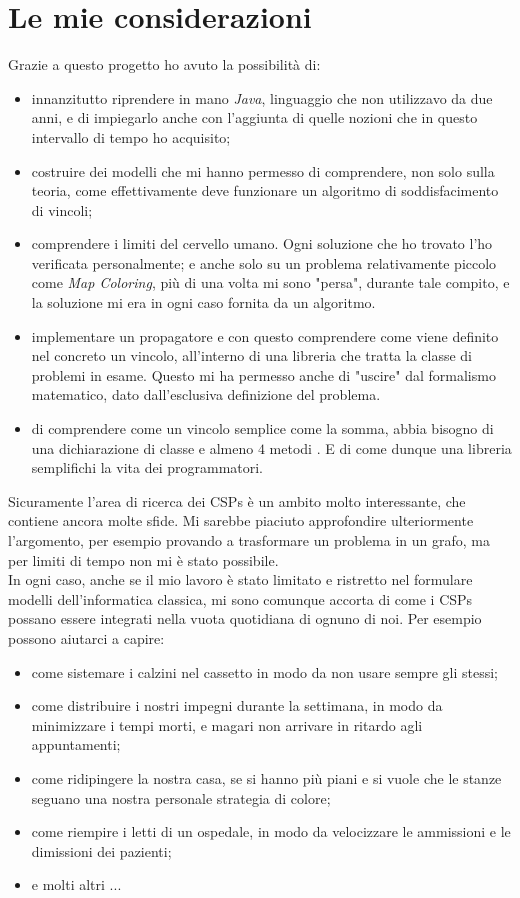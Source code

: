 \newpage
\section{Le mie considerazioni}
Grazie a questo progetto ho avuto la possibilit\`a di:
\begin{itemize}
\item innanzitutto riprendere in mano \textit{Java}, linguaggio  che non utilizzavo da due anni, e di impiegarlo anche con l'aggiunta di quelle nozioni che in questo intervallo di tempo ho acquisito;
\item costruire dei modelli che mi hanno permesso di comprendere, non solo sulla teoria, come effettivamente deve funzionare un algoritmo di soddisfacimento di vincoli;
\item comprendere i limiti del cervello umano. Ogni soluzione che ho trovato l'ho verificata personalmente; e  anche solo su un problema relativamente piccolo come \textit{Map Coloring}, pi\`u di una volta mi sono "persa", durante tale compito, e la soluzione mi era in ogni caso fornita da un algoritmo.
\item implementare un propagatore e con questo comprendere come viene definito nel concreto un vincolo, all'interno di una libreria che tratta la classe di problemi in esame. Questo mi ha permesso anche di "uscire" dal formalismo matematico, dato dall'esclusiva definizione del problema.
\item di comprendere come un vincolo semplice come la somma, abbia bisogno di una dichiarazione di classe e almeno $4$ metodi . E di come dunque una libreria semplifichi la vita dei programmatori.
\end{itemize}
\noindent
Sicuramente l'area di ricerca dei CSPs \`e un ambito molto interessante, che contiene ancora molte sfide. Mi sarebbe piaciuto approfondire ulteriormente l'argomento, per esempio provando a trasformare un problema in un grafo, ma per limiti di tempo non mi \`e stato possibile.\\ In ogni caso,  anche se il mio lavoro \`e stato limitato e ristretto nel formulare modelli dell'informatica classica, mi sono comunque accorta di come i CSPs possano essere integrati nella vuota quotidiana di ognuno di noi. Per esempio possono aiutarci a capire:
\begin{itemize}
\item come sistemare i calzini nel cassetto in modo da non usare sempre gli stessi;
\item come distribuire i nostri impegni durante la settimana, in modo da minimizzare i tempi morti, e magari non arrivare in ritardo agli appuntamenti;
\item come ridipingere la nostra casa, se si hanno pi\`u piani e si vuole che le stanze seguano una nostra personale strategia di colore;
\item come riempire i letti di un ospedale, in modo da velocizzare le ammissioni e le dimissioni dei pazienti;
\item e molti altri ...
\end{itemize}

